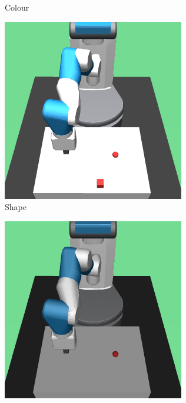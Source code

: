 \begin{figure}
\begin{subfigure}{0.19\textwidth}
    \caption{Colour}
  \end{subfigure}
  \begin{subfigure}{0.19\textwidth}
    \includegraphics[width=\textwidth]{figures/chapter6/test_observations/shape}
    \caption{Shape}
  \end{subfigure}
  \begin{subfigure}{0.19\textwidth}
    \includegraphics[width=\textwidth]{figures/chapter6/test_observations/illumination}

\end{subfigure}
\end{figure}
